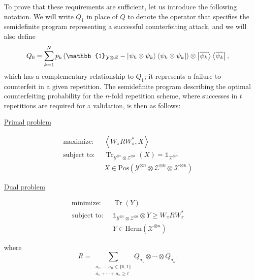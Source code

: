 \documentclass[11pt,letterpaper]{article}
\theoremstyle{definition}
\newcommand{\microspace}{\mspace{0.5mu}}
\newcommand{\tr}{\operatorname{Tr}}
\newcommand{\ip}[2]{\left\langle #1 , #2\right\rangle}
\def\I{\mathbb{1}}
\newcommand{\setft}[1]{\mathrm{#1}}
\newcommand{\herm}[1]{\setft{Herm}\left(#1\right)}
\newcommand{\pos}[1]{\setft{Pos}\left(#1\right)}
\def \lket {\left|}
\def \rket {\right\rangle}
\def \lbra {\left\langle}
\def \rbra {\right|}
\newcommand{\ket}[1]{\lket\microspace #1 \microspace\rket}
\newcommand{\bra}[1]{\lbra\microspace #1 \microspace\rbra}
\def\X{\mathcal{X}}
\def\Y{\mathcal{Y}}
\def\Z{\mathcal{Z}}
\begin{document}
To prove that these requirements are sufficient, let us introduce the
following notation.
We will write $Q_1$ in place of $Q$ to denote the operator that
specifies the semidefinite program representing a successful
counterfeiting attack, and we will also define
\[
Q_0 = \sum_{k = 1}^N p_k \left( \I_{\Y\otimes\Z} -
\ket{\psi_k\otimes\psi_k}\bra{\psi_k\otimes\psi_k}\right)
\otimes \ket{\overline{\psi_k}}\bra{\overline{\psi_k}},
\]
which has a complementary relationship to $Q_1$;
it represents a failure to counterfeit in a given repetition.
The semidefinite program describing the optimal counterfeiting
probability for the $n$-fold repetition scheme, where successes in $t$
repetitions are required for a validation, is then as follows:
\begin{center}
\begin{minipage}{0.45\textwidth}
  \centerline{\underline{Primal problem}}\vspace{-6mm}
  \begin{align*}
    \text{maximize:}\;\; & \ip{W_\pi R W_\pi^{\ast}}{X}\\
    \text{subject to:}\;\; & \tr_{\Y^{\otimes n}\otimes\Z^{\otimes
        n}}(X) = \I_{\X^{\otimes n}}\\
    & X\in\pos{\Y^{\otimes n}\otimes\Z^{\otimes n}\otimes\X^{\otimes n}}
  \end{align*}
\end{minipage}\hspace*{4mm}
\begin{minipage}{0.45\textwidth}
  \centerline{\underline{Dual problem}}\vspace{-6mm}
  \begin{align*}
    \text{minimize:}\;\; & \tr(Y)\\
    \text{subject to:}\;\; & \I_{\Y^{\otimes n}\otimes\Z^{\otimes
        n}}\otimes Y \geq W_\pi R W_\pi^{\ast}\\
    & Y \in \herm{\X^{\otimes n}}
  \end{align*}
\end{minipage}
\end{center}
where
\[
R = \sum_{\substack{a_1,\ldots,a_n\in\{0,1\}\\a_1 + \cdots + a_n\geq t}}
Q_{a_1} \otimes \cdots \otimes Q_{a_n}.
\]
\end{document}
